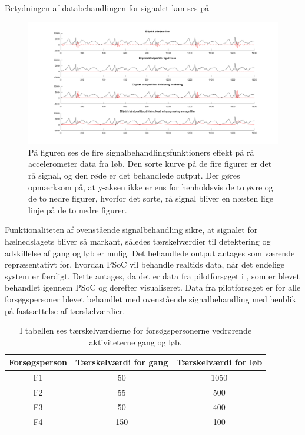 Betydningen af databehandlingen for signalet kan ses på 
\begin{figure}[H]
	\centering
	\includegraphics[scale=0.37]{figures/cDesign/signalbehandling_psoc.png}
	\caption{På figuren ses de fire signalbehandlingsfunktioners effekt på rå accelerometer data fra løb. Den sorte kurve på de fire figurer er det rå signal, og den røde er det behandlede output. Der gøres opmærksom på, at y-aksen ikke er ens for henholdsvis de to øvre og de to nedre figurer, hvorfor det sorte, rå signal bliver en næsten lige linje på de to nedre figurer.}
	\label{fig:algoritme_cykling2}
\end{figure}
Funktionaliteten af ovenstående signalbehandling sikre, at signalet for hælnedslagets bliver så markant, således tærskelværdier til detektering og adskillelse af gang og løb er mulig. Det behandlede output antages som værende repræsentativt for, hvordan PSoC vil behandle realtids data, når det endelige system er færdigt. Dette antages, da det er data fra pilotforsøget i , som er blevet behandlet igennem PSoC og derefter visualiseret. Data fra pilotforsøget er for alle forsøgspersoner blevet behandlet med ovenstående signalbehandling med henblik på fastsættelse af tærskelværdier. 
\begin{table}[H]
	\centering
	\begin{tabular}{ccc}
		\hline
		\rowcolor[HTML]{C0C0C0} 
		Forsøgsperson & Tærskelværdi for gang & Tærskelværdi for løb \\ \hline
		\rowcolor[HTML]{FFFFFF} 
		F1 & 50 & 1050 \\ \hline
		\rowcolor[HTML]{FFFFFF} 
		F2 & 55 & 500 \\ \hline
		\rowcolor[HTML]{FFFFFF} 
		F3 & 50 & 400 \\ \hline
		\rowcolor[HTML]{FFFFFF} 
		F4 & 150 & 100 \\ \hline
	\end{tabular}
	\caption{I tabellen ses tærskelværdierne for forsøgspersonerne vedrørende aktiviteterne gang og løb.}
	\label{tab:individuel_taerskel}
\end{table}\vspace{-0.5cm}
